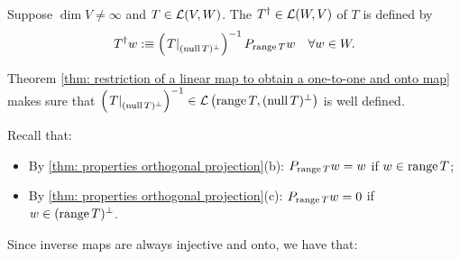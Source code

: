 \begin{mydef}
  Suppose $\dim V \neq \infty$ and $T \in \mathcal{L}(V,W)$. The  $T^\dagger \in \mathcal{L}(W, V)$ of $T$ is defined by
  \[
    T^\dagger w :\equiv  \left( \left. T \right|_{(\operatorname{null} T)^\bot} \right)^{-1} P_{\operatorname{range} T} w \quad \forall w \in W.
  \]

  Theorem \ref{thm: restriction of a linear map to obtain a one-to-one and onto map} makes sure that $\left( \left. T \right|_{(\operatorname{null} T)^\bot} \right)^{-1} \in \mathcal{L} \left(\operatorname{range} T, (\operatorname{null} T)^\bot \right)$ is well defined.
\end{mydef}

Recall that:
\begin{itemize}
  \item By \ref{thm: properties orthogonal projection}(b): $P_{\operatorname{range} T} w = w$ if $w \in \operatorname{range} T$;
  \item By \ref{thm: properties orthogonal projection}(c): $P_{\operatorname{range} T} w =0$ if $w \in (\operatorname{range} T)^\bot$.
\end{itemize}

Since inverse maps are always injective and onto, we have that:

